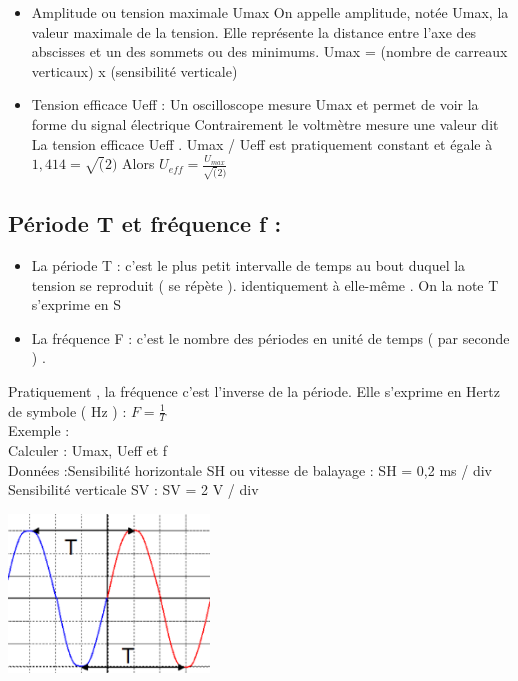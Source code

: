\documentclass[12pt]{article}
\begin{document}
\begin{itemize}
  \item Amplitude ou tension maximale Umax
On appelle amplitude, notée Umax, la valeur maximale de la tension. Elle
représente la distance entre l’axe des abscisses et un des sommets ou des
minimums.
Umax = (nombre de carreaux verticaux) x (sensibilité verticale)

\item Tension efficace Ueff :
Un oscilloscope mesure Umax et permet de voir la forme du signal électrique
Contrairement le voltmètre mesure une valeur dit La tension efficace Ueff .
    Umax / Ueff est pratiquement constant et égale à $1,414=\sqrt(2)$
    Alors $U_{eff} = \frac{U_{max}}{\sqrt(2)}$
\end{itemize}




\subsection{Période T et fréquence f : }
\begin{itemize}
  \item La période T : c’est le plus petit intervalle de temps au bout duquel la tension se reproduit ( se répète ). identiquement à elle-même . On la note T s’exprime en S

  \item La fréquence F : c’est le nombre des périodes en unité de temps ( par
seconde ) .
\end{itemize}
Pratiquement , la fréquence c’est l’inverse de la période. Elle s’exprime
en Hertz de symbole ( Hz ) : $F = \frac{1}{T}$
\\Exemple :
\\Calculer : Umax, Ueff et f
\\Données :Sensibilité horizontale SH ou vitesse de balayage : SH = 0,2 ms / div
\\Sensibilité verticale SV : SV = 2 V / div
\begin{center}
\includegraphics[width=0.4\textwidth]{./img/img_perod_08.png}
\end{center}
\end{document}
